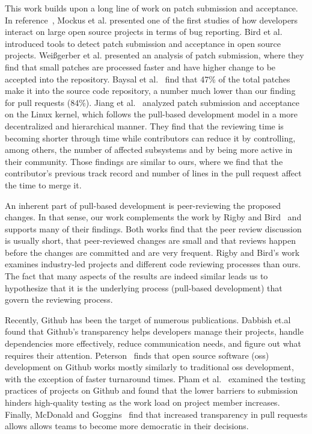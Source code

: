 \documentclass{sig-alternate}
\begin{document}
This work builds upon a long line of work on patch submission and acceptance.
In reference~\cite{MOCKU02}, Mockus et al. presented one of the first studies of
how developers interact on large open source projects in terms of bug reporting.
Bird et al.~\cite{Bird07a} introduced tools to detect patch submission and
acceptance in open source projects. Wei\ss gerber et al. presented an analysis
of patch submission, where they find that small patches are processed faster and
have higher change to be accepted into the repository. Baysal et
al.~\cite{Baysa12} find that 47\% of the total patches make it into the source
code repository, a number much lower than our finding for pull requests (84\%).
Jiang et al.~\cite{Jiang13} analyzed patch submission and acceptance on the
Linux kernel, which follows the pull-based development model in a more
decentralized and hierarchical manner. They find that the reviewing time is
becoming shorter through time while contributors can reduce it by controlling,
among others, the number of affected subsystems and by being more active in
their community. Those findings are similar to ours, where we find that the
contributor's previous track record and number of lines in the pull request
affect the time to merge it.

An inherent part of pull-based development is peer-reviewing the proposed
changes. In that sense, our work complements the work by Rigby and
Bird~\cite{Rigby13} and supports many of their findings. Both works find that
the peer review discussion is usually short, that peer-reviewed changes are
small and that reviews happen before the changes are committed and are very
frequent. Rigby and Bird's work examines industry-led projects and different
code reviewing processes than ours. The fact that many aspects of the results
are indeed similar leads us to hypothesize that it is the underlying
process (pull-based development) that govern the reviewing process.

Recently, Github has been the target of numerous publications. Dabbish
et.al~\cite{Dabbi13} found that Github's transparency helps developers manage
their projects, handle dependencies more effectively, reduce communication
needs, and figure out what requires their attention. Peterson~\cite{Peter13}
finds that open source software ({\sc oss}) development on Github works mostly
similarly to traditional {\sc oss} development, with the exception of faster
turnaround times. Pham et al.~\cite{Pham13} examined the testing practices of
projects on Github and found that the lower barriers to submission hinders
high-quality testing as the work load on project member increases.  
Finally, McDonald and Goggins~\cite{McDon13} find that increased transparency in pull
requests allows allows teams to become more democratic in their decisions. 
\end{document}
